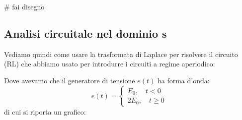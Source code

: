 \documentclass[a4paper,11pt]{article}
\begin{document}
# fai disegno

\subsection{Analisi circuitale nel dominio s}
Vediamo quindi come usare la trasformata di Laplace per risolvere il circuito (RL) che abbiamo usato per introdurre i circuiti a regime aperiodico:

\begin{center}
\end{center}

Dove avevamo che il generatore di tensione $e(t)$ ha forma d'onda:
\[
	e(t) =
	\begin{cases}
		E_0, \quad t < 0 \\ 
		2E_0, \quad t \geq 0
	\end{cases}
\]
di cui si riporta un grafico:
\begin{center}
\end{center}
\end{document}
